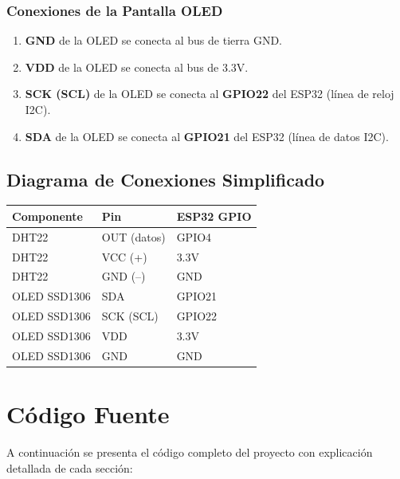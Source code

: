\documentclass[12pt,a4paper]{article}
\begin{document}
\subsubsection*{Conexiones de la Pantalla OLED}
\begin{enumerate}
    \item \textbf{GND} de la OLED se conecta al bus de tierra GND.
    \item \textbf{VDD} de la OLED se conecta al bus de 3.3V.
    \item \textbf{SCK (SCL)} de la OLED se conecta al \textbf{GPIO22} del ESP32 (línea de reloj I2C).
    \item \textbf{SDA} de la OLED se conecta al \textbf{GPIO21} del ESP32 (línea de datos I2C).
\end{enumerate}

\subsection{Diagrama de Conexiones Simplificado}
\begin{center}
\begin{tabular}{lll}
\toprule
\textbf{Componente} & \textbf{Pin} & \textbf{ESP32 GPIO} \\
\midrule
DHT22 & OUT (datos) & GPIO4 \\
DHT22 & VCC (+) & 3.3V \\
DHT22 & GND (--) & GND \\
OLED SSD1306 & SDA & GPIO21 \\
OLED SSD1306 & SCK (SCL) & GPIO22 \\
OLED SSD1306 & VDD & 3.3V \\
OLED SSD1306 & GND & GND \\
\bottomrule
\end{tabular}
\end{center}

\section{Código Fuente}

A continuación se presenta el código completo del proyecto con explicación detallada de cada sección:
\end{document}
